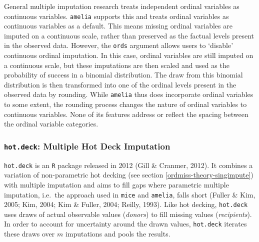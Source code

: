 \documentclass[12pt,econ]{sources/authesis}
\begin{document}
General multiple imputation research treats independent ordinal variables as continuous variables. \texttt{amelia} supports this and treats ordinal variables as continuous variables as a default. This means missing ordinal variables are imputed on a continuous scale, rather than preserved as the factual levels present in the observed data. However, the \texttt{ords} argument allows users to `disable' continuous ordinal imputation. In this case, ordinal variables are still imputed on a continuous scale, but these imputations are then scaled and used as the probability of success in a binomial distribution. The draw from this binomial distribution is then transformed into one of the ordinal levels present in the observed data by rounding. While \texttt{amelia} thus does incorporate ordinal variables to some extent, the rounding process changes the nature of ordinal variables to continuous variables. None of its features address or reflect the spacing between the ordinal variable categories.

\hypertarget{ordmiss-theory-multimpute-hdnorm}{%
\subsubsection{\texorpdfstring{\texttt{hot.deck}: Multiple Hot Deck Imputation}{hot.deck: Multiple Hot Deck Imputation}}\label{ordmiss-theory-multimpute-hdnorm}}

\texttt{hot.deck} is an \texttt{R} package released in 2012 (Gill \& Cranmer, 2012). It combines a variation of non-parametric hot decking (see section \ref{ordmiss-theory-singimpute}) with multiple imputation and aims to fill gaps where parametric multiple imputation, i.e.~the approach used in \texttt{mice} and \texttt{amelia}, falls short (Fuller \& Kim, 2005; Kim, 2004; Kim \& Fuller, 2004; Reilly, 1993). Like hot decking, \texttt{hot.deck} uses draws of actual observable values (\textit{donors}) to fill missing values (\textit{recipients}). In order to account for uncertainty around the drawn values, \texttt{hot.deck} iterates these draws over \(m\) imputations and pools the results.
\end{document}
